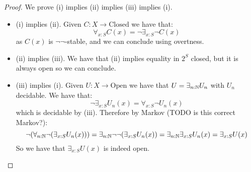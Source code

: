 \begin{proof}
We prove (i) implies (ii) implies (iii) implies (i).
\begin{itemize}
\item (i) implies (ii). Given $C:X\to \mathrm{Closed}$ we have that:
\[\forall_{x:S} C(x) = \neg \exists_{x:S} \neg C(x)\]
as $C(x)$ is $\neg\neg$-stable, and we can conclude using overtness.
\item (ii) implies (iii). We have that (ii) implies equality in $2^S$ closed, but it is always open so we can conclude.
\item (iii) implies (i). Given $U:X\to \mathrm{Open}$ we have that $U = \exists_{n:\mathbb{N}} U_n$ with $U_n$ decidable. We have that:
\[\neg \exists_{x:S} U_n(x) = \forall_{x:S} \neg U_n(x)\]
which is decidable by (iii). Therefore by Markov (TODO is this correct Markov?):
\[\neg(\forall_{n:\mathbb{N}} \neg (\exists_{x:S} U_n(x))) =  \exists_{n:\mathbb{N}} \neg\neg (\exists_{x:S} U_n(x)) =  \exists_{n:\mathbb{N}} \exists_{x:S} U_n(x) = \exists_{x:S}U(x)\]
So we have that $\exists_{x:S}U(x)$ is indeed open.
\end{itemize}
\end{proof}